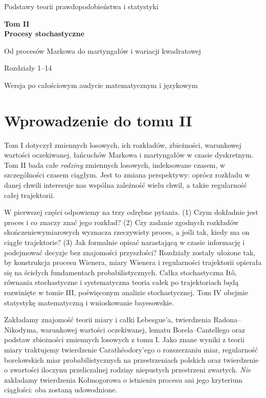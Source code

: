 \documentclass[11pt,a4paper,oneside]{report}
\numberwithin{equation}{chapter}
\theoremstyle{plain}
\theoremstyle{definition}
\theoremstyle{remark}
\begin{document}
\hypersetup{pageanchor=false}
\begin{titlepage}
\centering
\vspace*{3.4cm}
{\Large Podstawy teorii prawdopodobieństwa i statystyki\par}
\vspace{1.2cm}
{\Huge\bfseries Tom II\\[0.2cm] Procesy stochastyczne\par}
\vspace{0.8cm}
{\LARGE Od procesów Markowa do martyngałów i wariacji kwadratowej\par}
\vspace{0.6cm}
{\Large Rozdziały 1--14\par}
\vfill
{\large Wersja po całościowym audycie matematycznym i językowym\par}
\vspace{1.2cm}
\end{titlepage}
\hypersetup{pageanchor=true}
\tableofcontents
\chapter*{Wprowadzenie do tomu II}
Tom I dotyczył zmiennych losowych, ich rozkładów, zbieżności, warunkowej
wartości oczekiwanej, łańcuchów Markowa i martyngałów w czasie dyskretnym.
Tom II bada całe \emph{rodziny} zmiennych losowych, indeksowane czasem,
w szczególności czasem ciągłym. Jest to zmiana perspektywy: oprócz rozkładu
w danej chwili interesuje nas wspólna zależność wielu chwil, a także
regularność całej trajektorii.

W pierwszej części odpowiemy na trzy odrębne pytania. (1) Czym dokładnie
jest proces i co znaczy znać jego rozkład? (2) Czy zadanie zgodnych
rozkładów skończeniewymiarowych wyznacza rzeczywisty proces, a jeśli tak,
kiedy ma on ciągłe trajektorie? (3) Jak formalnie opisać narastającą
w czasie informację i podejmować decyzje bez znajomości przyszłości?
Rozdziały zostały ułożone tak, by konstrukcja procesu Wienera,
miary Wienera i regularności trajektorii opierała się na ścisłych
fundamentach probabilistycznych. Całka stochastyczna Itô,
równania stochastyczne i systematyczna teoria całek po trajektoriach
będą rozwinięte w tomie III, poświęconym analizie stochastycznej.
Tom IV obejmie statystykę matematyczną i wnioskowanie bayesowskie.

Zakładamy znajomość teorii miary i całki Lebesgue'a, twierdzenia
Radona--Nikodyma, warunkowej wartości oczekiwanej, lematu
Borela--Cantellego oraz podstaw zbieżności zmiennych losowych z tomu I.
Jako znane wyniki z teorii miary traktujemy twierdzenie Carathéodory'ego
o rozszerzaniu miar, regularność borelowskich miar probabilistycznych
na przestrzeniach polskich oraz twierdzenie o zwartości iloczynu
przeliczalnej rodziny niepustych przestrzeni zwartych.
\emph{Nie} zakładamy twierdzenia Kołmogorowa o istnieniu procesu ani jego
kryterium ciągłości: oba zostaną udowodnione.
\end{document}
